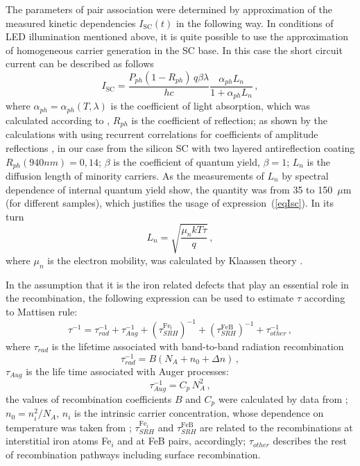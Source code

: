The parameters of pair association were determined by approximation of the measured kinetic
dependencies $I_\mathrm{SC}(t)$ in the following way.
In conditions of LED illumination mentioned above,
it is quite possible to use the approximation of homogeneous carrier generation in the SC base.
In this case the short circuit current can be described as follows \cite{Bube,Razeghi}
\begin{equation}
\label{eqIsc}
I_\mathrm{SC}=\frac{P_{ph}(1-R_{ph})\,q\beta\lambda}{hc}\frac{\alpha_{ph}L_n}{1+\alpha_{ph}L_n}\,,
\end{equation}
where
$\alpha_{ph}=\alpha_{ph}(T,\lambda)$ is the coefficient of light absorption,
which was calculated according to \cite{Si:Absorb,GreenOptic},
$R_{ph}$ is the coefficient of reflection;
as shown by the calculations with using recurrent correlations for coefficients of amplitude reflections \cite{KostRefl2000,KostRefl2000A},
in our case from the silicon SC with two layered antireflection coating $R_{ph}(940 nm)=0,14$;
$\beta$ is the coefficient of quantum  yield, $\beta=1$;
$L_n$  is the diffusion length of minority carriers.
As the measurements of $L_n$ by spectral dependence of internal quantum yield show,
the quantity was from 35 to 150~$\mu$m (for different samples),
which justifies the usage of expression~(\ref{eqIsc}).
In its turn
\begin{equation}
\label{eqLn}
L_n=\sqrt{\frac{\mu_nkT\tau}{q}}\,,
\end{equation}
where
$\mu_n$ is the electron mobility, was calculated by Klaassen theory \cite{KLAASSEN953}.

In the assumption that it is the iron related defects that play an essential role in the recombination,
the following expression can be used to estimate $\tau$ according to Mattisen rule:
\begin{equation}
\label{eqTau}
\tau^{-1}=\tau_{rad}^{-1}+\tau_{Aug}^{-1}+(\tau_{SRH}^{\mathrm{Fe_i}})^{-1}
+(\tau_{SRH}^\mathrm{FeB})^{-1}+\tau_{other}^{-1}\,,
\end{equation}
where
$\tau_{rad}$ is the lifetime associated with band-to-band radiation recombination
\begin{equation}
\label{eqTauRad}
\tau_{rad}^{-1}=B(N_A+n_0+\Delta n)\,,
\end{equation}
$\tau_{Aug}$ is the life time associated with Auger processes:
\begin{equation}
\label{eqTauAug}
\tau_{Aug}^{-1}=C_p\,N_A^2\,,
\end{equation}
the values of recombination coefficients $B$ and $C_p$ were calculated by data from \cite{Si_BtB,Si_Auger};
$n_0=n_i^2/N_A$,
$n_i$ is the intrinsic carrier concentration, whose dependence on temperature was taken from \cite{Si_ni_Couderc};
$\tau_{SRH}^{\mathrm{Fe_i}}$  and $\tau_{SRH}^\mathrm{FeB}$ are related to the recombinations at interstitial iron atoms Fe$_i$ and at FeB pairs, accordingly;
$\tau_{other}$ describes the rest of recombination pathways including surface recombination.

